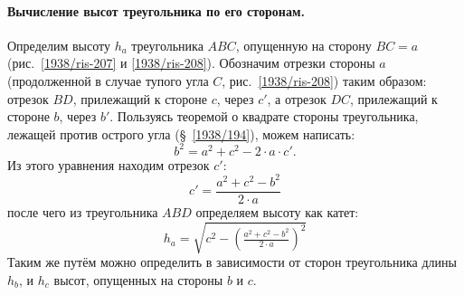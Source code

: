 \paragraph{Вычисление высот треугольника по его сторонам.}\label{1938/198}
Определим высоту $h_a$ треугольника $ABC$, опущенную на сторону $BC=a$ (рис.~\ref{1938/ris-207} и \ref{1938/ris-208}).
Обозначим отрезки стороны $a$ (продолженной в случае тупого угла $C$, рис.~\ref{1938/ris-208}) таким образом:
отрезок $BD$, прилежащий к стороне $c$, через $c'$, а отрезок $DC$, прилежащий к стороне $b$, через $b'$.
Пользуясь теоремой о квадрате стороны треугольника, лежащей против острого угла (§~\ref{1938/194}), можем написать:
\[b^2=a^2+c^2-2\cdot a\cdot c'.\]
Из этого уравнения находим отрезок $c'$:
\[c'=\frac{a^2+c^2-b^2}{2\cdot a}\]
после чего из треугольника $ABD$ определяем высоту как катет:
\[h_a=\sqrt{c^2-\left(\tfrac{a^2+c^2-b^2}{2\cdot a}\right)^2}\]
Таким же путём можно определить в зависимости от сторон треугольника длины $h_b$, и $h_c$ высот, опущенных на стороны $b$ и $c$.
